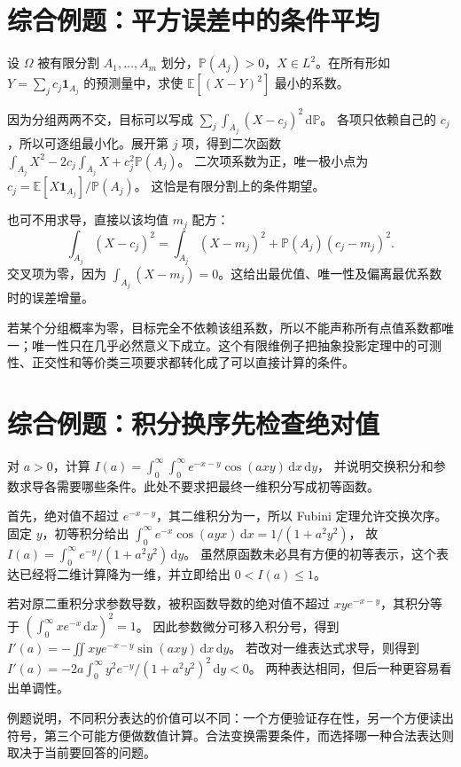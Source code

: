 \documentclass[UTF8,12pt,a4paper,fontset=fandol]{ctexbook}
\begin{document}
\section{综合例题：平方误差中的条件平均}
\begin{example}
设 $\Omega$ 被有限分割 $A_1,\ldots,A_m$ 划分，$\mathbb P(A_j)>0$，$X\in L^2$。在所有形如 $Y=\sum_jc_j\mathbf1_{A_j}$ 的预测量中，求使 $\mathbb E[(X-Y)^2]$ 最小的系数。
\end{example}
\begin{solve}
因为分组两两不交，目标可以写成
$\sum_j\int_{A_j}(X-c_j)^2\,\mathrm d\mathbb P$。
各项只依赖自己的 $c_j$，所以可逐组最小化。展开第 $j$ 项，得到二次函数
$\int_{A_j}X^2-2c_j\int_{A_j}X+c_j^2\mathbb P(A_j)$。
二次项系数为正，唯一极小点为
$c_j=\mathbb E[X\mathbf1_{A_j}]/\mathbb P(A_j)$。
这恰是有限分割上的条件期望。

也可不用求导，直接以该均值 $m_j$ 配方：
\[
 \int_{A_j}(X-c_j)^2
 =\int_{A_j}(X-m_j)^2+\mathbb P(A_j)(c_j-m_j)^2.
\]
交叉项为零，因为 $\int_{A_j}(X-m_j)=0$。这给出最优值、唯一性及偏离最优系数时的误差增量。
\end{solve}
若某个分组概率为零，目标完全不依赖该组系数，所以不能声称所有点值系数都唯一；唯一性只在几乎必然意义下成立。这个有限维例子把抽象投影定理中的可测性、正交性和等价类三项要求都转化成了可以直接计算的条件。

\section{综合例题：积分换序先检查绝对值}
\begin{example}
对 $a>0$，计算
$I(a)=\int_0^\infty\int_0^\infty e^{-x-y}\cos(axy)\,\mathrm dx\,\mathrm dy$，
并说明交换积分和参数求导各需要哪些条件。此处不要求把最终一维积分写成初等函数。
\end{example}
\begin{solve}
首先，绝对值不超过 $e^{-x-y}$，其二维积分为一，所以 Fubini 定理允许交换次序。固定 $y$，初等积分给出
$\int_0^\infty e^{-x}\cos(ayx)\,\mathrm dx=1/(1+a^2y^2)$，
故
$I(a)=\int_0^\infty e^{-y}/(1+a^2y^2)\,\mathrm dy$。
虽然原函数未必具有方便的初等表示，这个表达已经将二维计算降为一维，并立即给出 $0<I(a)\leq1$。

若对原二重积分求参数导数，被积函数导数的绝对值不超过 $xy e^{-x-y}$，其积分等于
$(\int_0^\infty xe^{-x}\,\mathrm dx)^2=1$。
因此参数微分可移入积分号，得到
$I'(a)=-\iint xy e^{-x-y}\sin(axy)\,\mathrm dx\,\mathrm dy$。
若改对一维表达式求导，则得到
$I'(a)=-2a\int_0^\infty y^2e^{-y}/(1+a^2y^2)^2\,\mathrm dy<0$。
两种表达相同，但后一种更容易看出单调性。
\end{solve}
例题说明，不同积分表达的价值可以不同：一个方便验证存在性，另一个方便读出符号，第三个可能方便做数值计算。合法变换需要条件，而选择哪一种合法表达则取决于当前要回答的问题。
\end{document}

